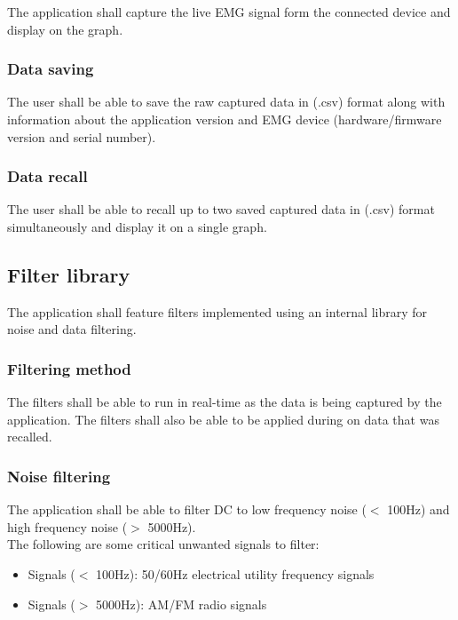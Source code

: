 \documentclass[12pt,a4paper]{article}
\begin{document}
The application shall capture the live EMG signal form the connected device and display on the graph.

\subsubsection{Data saving}

The user shall be able to save the raw captured data in (.csv) format along with information about the application version and EMG device (hardware/firmware version and serial number).

\subsubsection{Data recall}

The user shall be able to recall up to two saved captured data in (.csv) format simultaneously and display it on a single graph.

\subsection{Filter library}

The application shall feature filters implemented using an internal library for noise and data filtering.

\subsubsection{Filtering method}

The filters shall be able to run in real-time as the data is being captured by the application. 
The filters shall also be able to be applied during on data that was recalled.

\subsubsection{Noise filtering}

The application shall be able to filter DC to low frequency noise ($<$ 100Hz) and high frequency noise ($>$ 5000Hz). \\

The following are some critical unwanted signals to filter: 

\begin{itemize}
	\item Signals ($<$ 100Hz): 50/60Hz electrical utility frequency signals
	\item Signals ($>$ 5000Hz): AM/FM radio signals
\end{itemize}
\end{document}
